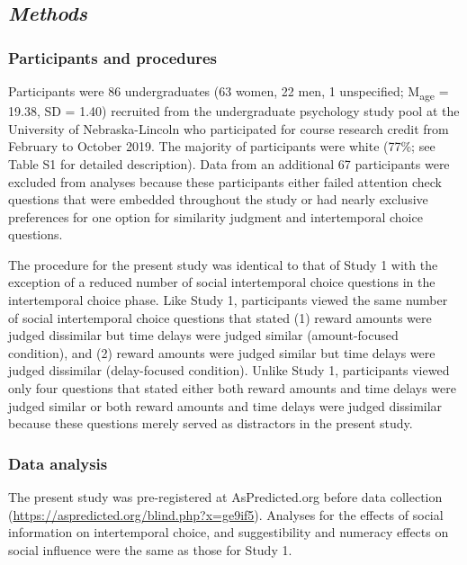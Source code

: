 \documentclass[
  pub,floatsintext]{apa6}
\begin{document}
\hypertarget{methods-1}{%
\subsection{\texorpdfstring{\emph{Methods}}{Methods}}\label{methods-1}}

\hypertarget{participants-and-procedures-1}{%
\subsubsection{Participants and procedures}\label{participants-and-procedures-1}}

Participants were 86 undergraduates (63 women, 22 men, 1 unspecified; M\textsubscript{age} = 19.38, SD = 1.40) recruited from the undergraduate psychology study pool at the University of Nebraska-Lincoln who participated for course research credit from February to October 2019. The majority of participants were white (77\%; see Table S1 for detailed description). Data from an additional 67 participants were excluded from analyses because these participants either failed attention check questions that were embedded throughout the study or had nearly exclusive preferences for one option for similarity judgment and intertemporal choice questions.

The procedure for the present study was identical to that of Study 1 with the exception of a reduced number of social intertemporal choice questions in the intertemporal choice phase. Like Study 1, participants viewed the same number of social intertemporal choice questions that stated (1) reward amounts were judged dissimilar but time delays were judged similar (amount-focused condition), and (2) reward amounts were judged similar but time delays were judged dissimilar (delay-focused condition). Unlike Study 1, participants viewed only four questions that stated either both reward amounts and time delays were judged similar or both reward amounts and time delays were judged dissimilar because these questions merely served as distractors in the present study.

\hypertarget{data-analysis-1}{%
\subsubsection{Data analysis}\label{data-analysis-1}}

The present study was pre-registered at AsPredicted.org before data collection (\url{https://aspredicted.org/blind.php?x=ge9if5}). Analyses for the effects of social information on intertemporal choice, and suggestibility and numeracy effects on social influence were the same as those for Study 1.
\end{document}
